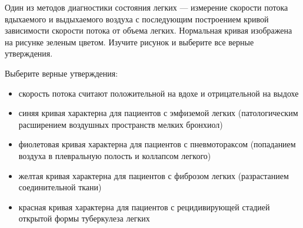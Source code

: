 
Один из методов
диагностики состояния легких — измерение скорости потока вдыхаемого и
выдыхаемого воздуха с последующим построением кривой зависимости скорости
потока от объема легких. Нормальная кривая изображена на рисунке зеленым
цветом. Изучите рисунок и выберите все верные утверждения.


Выберите верные утверждения:

\begin{itemize}
    \item скорость потока считают положительной на вдохе и отрицательной на выдохе
    \item синяя кривая характерна для пациентов с эмфиземой легких (патологическим расширением воздушных пространств мелких бронхиол)
    \item фиолетовая кривая характерна для пациентов с пневмотораксом (попаданием воздуха в плевральную полость и коллапсом легкого)
    \item желтая кривая характерна для пациентов с фиброзом легких (разрастанием соединительной ткани)
    \item красная кривая характерна для пациентов с рецидивирующей стадией открытой формы туберкулеза легких
\end{itemize}

